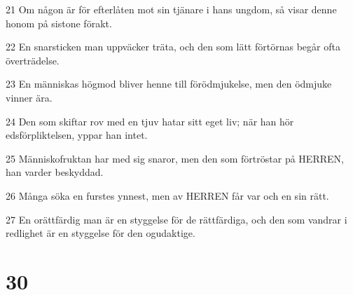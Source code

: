 \par 21 Om någon är för efterlåten mot sin tjänare i hans ungdom, så visar denne honom på sistone förakt.
\par 22 En snarsticken man uppväcker träta, och den som lätt förtörnas begår ofta överträdelse.
\par 23 En människas högmod bliver henne till förödmjukelse, men den ödmjuke vinner ära.
\par 24 Den som skiftar rov med en tjuv hatar sitt eget liv; när han hör edsförpliktelsen, yppar han intet.
\par 25 Människofruktan har med sig snaror, men den som förtröstar på HERREN, han varder beskyddad.
\par 26 Många söka en furstes ynnest, men av HERREN får var och en sin rätt.
\par 27 En orättfärdig man är en styggelse för de rättfärdiga, och den som vandrar i redlighet är en styggelse för den ogudaktige.

\chapter{30}

